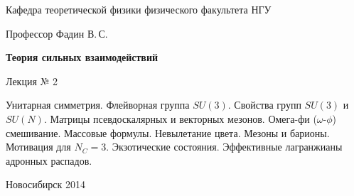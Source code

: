 \documentclass[12pt,pagesize,paper=192mm:108mm]{scrbook}
\begin{document}
\begin{titlepage}
\begin{center}
    Кафедра теоретической физики физического факультета НГУ
    \medskip

    \Large
    Профессор Фадин В.\,С.

    \huge
    \textbf{Теория сильных взаимодействий}
    \smallskip

    \Large
    Лекция № 2
    \vfill

    \normalsize
    \begin{minipage}{0.65\linewidth}
      Унитарная симметрия. Флейворная группа $SU(3)$. Свойства групп
      $SU(3)$ и $SU(N)$. Матрицы псевдоскалярных и векторных
      мезонов. Омега-фи ($\omega$-$\phi$) смешивание. Массовые
      формулы. Невылетание цвета. Мезоны и барионы. Мотивация для
      $N_C=3$. Экзотические состояния. Эффективные лагранжианы
      адронных распадов.
    \end{minipage}
    \vfill

    \normalsize \ccbysa\hspace{0.5em} Новосибирск 2014   
  \end{center}
\end{titlepage}
\end{document}

